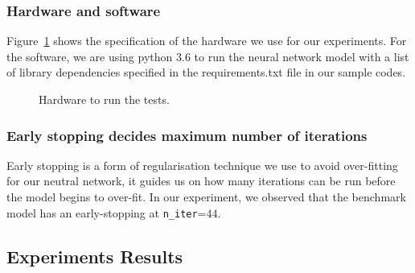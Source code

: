 \subsubsection{Hardware and software}
Figure~\ref{fig:hardware} shows the specification of the hardware we use for our experiments.
For the software, we are using python 3.6 to run the neural network model with a list of library dependencies specified in the requirements.txt file in our sample codes.

\begin{figure}
    \caption{Hardware to run the tests.}
    \label{fig:hardware}
\end{figure}


\subsubsection{Early stopping decides maximum number of iterations}
Early stopping is a form of regularisation technique we use to avoid over-fitting for our neutral network,
it guides us on how many iterations can be run before the model begins to over-fit.
In our experiment,
we observed that the benchmark model has an early-stopping at \texttt{n\_iter}=$44$.

\subsection{Experiments Results}
